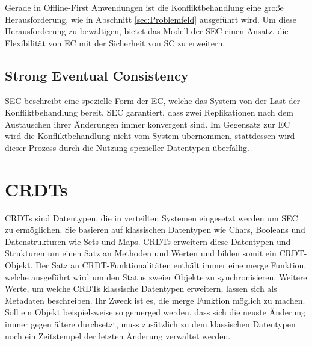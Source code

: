 \documentclass[a4paper, 12pt]{scrreprt}
\begin{document}
Gerade in Offline-First Anwendungen ist die Konfliktbehandlung eine große Herausforderung, wie in Abschnitt \ref{sec:Problemfeld} ausgeführt wird. Um diese Herausforderung zu bewältigen, bietet das Modell der \acf{SEC} einen Ansatz, die Flexibilität von \ac{EC} mit der Sicherheit von \ac{SC} zu erweitern. 




\subsection{Strong Eventual Consistency}


\ac{SEC} beschreibt eine spezielle Form der \acf{EC}, welche das System von der Last der Konfliktbehandlung bereit. \ac{SEC} garantiert, dass zwei Replikationen nach dem Austauschen ihrer Änderungen immer konvergent sind. Im Gegensatz zur \ac{EC} wird die Konfliktbehandlung nicht vom System übernommen, stattdessen wird dieser Prozess durch die Nutzung spezieller Datentypen überfällig.


\section{CRDTs}

CRDTs sind Datentypen, die in verteilten Systemen eingesetzt werden um \ac{SEC} zu ermöglichen. Sie basieren auf klassischen Datentypen wie Chars, Booleans und Datenstrukturen wie Sets und Maps. CRDTs erweitern diese Datentypen und Strukturen um einen Satz an Methoden und Werten und bilden somit ein CRDT-Objekt. Der Satz an CRDT-Funktionalitäten enthält immer eine merge Funktion, welche ausgeführt wird um den Status zweier Objekte zu synchronisieren.
Weitere Werte, um welche CRDTs klassische Datentypen erweitern, lassen sich als Metadaten beschreiben. Ihr Zweck ist es, die merge Funktion möglich zu machen. Soll ein Objekt beispielsweise so gemerged werden, dass sich die neuste Änderung immer gegen ältere durchsetzt, muss zusätzlich zu dem klassischen Datentypen noch ein Zeitstempel der letzten Änderung verwaltet werden.
\end{document}

